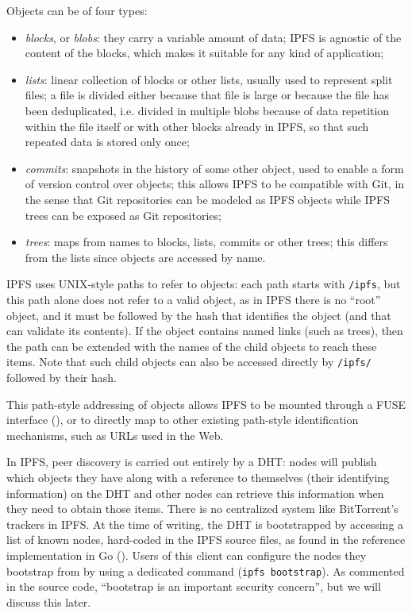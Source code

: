 \documentclass[mscthesis]{usiinfthesis}
\begin{document}
Objects can be of four types:
\begin{itemize}
	\item \emph{blocks}, or \textit{blobs}: they carry a variable amount of data; IPFS is agnostic of the content of the blocks, which makes it suitable for any kind of application;
	\item \emph{lists}: linear collection of blocks or other lists, usually used to represent split files; a file is divided either because that file is large or because the file has been deduplicated, i.e. divided in multiple blobs because of data repetition within the file itself or with other blocks already in IPFS, so that such repeated data is stored only once;
	\item \emph{commits}: snapshots in the history of some other object, used to enable a form of version control over objects; this allows IPFS to be compatible with Git, in the sense that Git repositories can be modeled as IPFS objects while IPFS trees can be exposed as Git repositories;
	\item \emph{trees}: maps from names to blocks, lists, commits or other trees; this differs from the lists since objects are accessed by name.
\end{itemize}

IPFS uses UNIX-style paths to refer to objects: each path starts with \texttt{/ipfs}, but this path alone does not refer to a valid object, as in IPFS there is no ``root'' object, and it must be followed by the hash that identifies the object (and that can validate its contents). If the object contains named links (such as trees), then the path can be extended with the names of the child objects to reach these items. Note that such child objects can also be accessed directly by \texttt{/ipfs/} followed by their hash.

This path-style addressing of objects allows IPFS to be mounted through a FUSE interface (\cite{website:fusegithub}), or to directly map to other existing path-style identification mechanisms, such as URLs used in the Web.

In IPFS, peer discovery is carried out entirely by a DHT: nodes will publish which objects they have along with a reference to themselves (their identifying information) on the DHT and other nodes can retrieve this information when they need to obtain those items. There is no centralized system like BitTorrent's trackers in IPFS.
At the time of writing, the DHT is bootstrapped by accessing a list of known nodes, hard-coded in the IPFS source files, as found in the reference implementation in Go (\cite{website:ipfsbootstrapsourcefile}). Users of this client can configure the nodes they bootstrap from by using a dedicated command (\texttt{ipfs bootstrap}). As commented in the source code, ``bootstrap is an important security concern'', but we will discuss this later.
\end{document}
